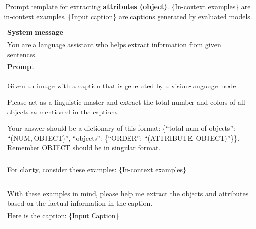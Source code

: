 \begin{table}[h!]\centering
\begin{minipage}{0.95\textwidth}   
\centering
\begin{tcolorbox} 
    \centering
    \small
    \begin{tabular}{p{}}
   { {\bf System message} } \\
    You are a language assistant who helps extract information from given sentences. \\
    \midrule
    {\bf Prompt}  \\
    Given an image with a caption that is generated by a vision-language model.
    
    Please act as a linguistic master and extract the total number and colors of all objects as mentioned in the captions.
    
    Your answer should be a dictionary of this format: \{``total num of objects'': ``(NUM, OBJECT)'', ``objects'': \{``ORDER'': ``(ATTRIBUTE, OBJECT)''\}\}. Remember OBJECT should be in singular format. \\\\

    For clarity, consider these examples: \textcolor[rgb]{0,0.7,0}{ \{In-context examples\} } \\
------------------- \\
        With these examples in mind, please help me extract the objects and attributes based on the factual information in the caption. \\
        Here is the caption: 
\textcolor[rgb]{0.8,0,0}{\{Input Caption\}} \\
\\

    \end{tabular}
\end{tcolorbox}
\caption{Prompt template for extracting \textbf{attributes (object)}. \textcolor[rgb]{0,0.7,0}{ \{In-context examples\} } are in-context examples. \textcolor[rgb]{0.8,0,0}{\{Input caption\}} are captions generated by evaluated models.}
    \label{tab:extraction_att_obj}
\end{minipage}
\end{table}

